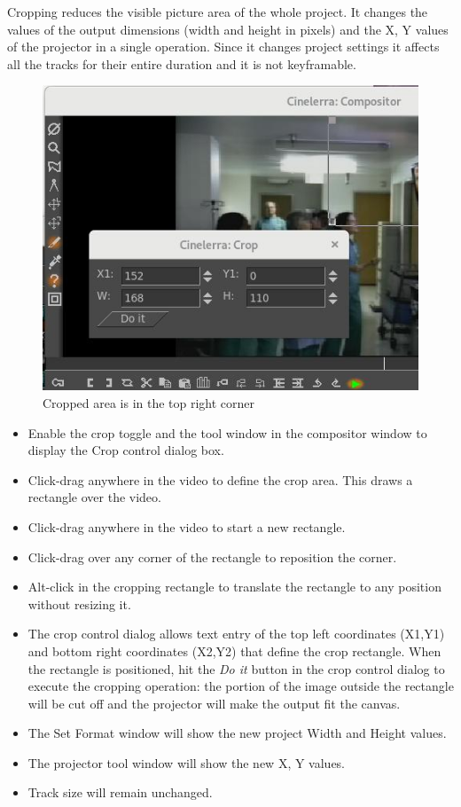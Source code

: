 Cropping reduces the visible picture area of the whole project. It changes the values of the output dimensions (width and height in pixels) and the X, Y values of the projector in a single operation. Since it changes project settings it affects all the tracks for their entire duration and it is not keyframable. 

\begin{figure}[htpb]
    \centering
    \includegraphics[width=0.5\linewidth]{images/cropped_area.png}
    \caption{Cropped area is in the top right corner}
    \label{fig:cropped_area}
\end{figure}

\begin{itemize}
    \item Enable the crop toggle and the tool window in the compositor window to display the Crop control dialog box.
    \item Click-drag anywhere in the video to define the crop area. This draws a rectangle over the video.
    \item Click-drag anywhere in the video to start a new rectangle.
    \item Click-drag over any corner of the rectangle to reposition the corner.
    \item Alt-click in the cropping rectangle to translate the rectangle to any position without resizing it.
    \item The crop control dialog allows text entry of the top left coordinates (X1,Y1) and bottom right coordinates (X2,Y2) that define the crop rectangle. When the rectangle is positioned, hit the \emph{Do it} button in the crop control dialog to execute the cropping operation: the portion of the image outside  the rectangle will be cut off and the projector will make the output fit the canvas.
    \item The Set Format window will show the new project Width and Height values.
    \item The projector tool window will show the new X, Y values.
    \item Track size will remain unchanged.
\end{itemize}
 
